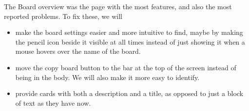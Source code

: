 \vspace{2mm}

The Board overview was the page with the most features, and also the most reported problems. To fix these, we will
\begin{itemize}
    \item make the board settings easier and more intuitive to find, maybe by making the pencil icon beside it visible at all times instead of just showing it when a mouse hovers over the name of the board.
    \item move the copy board button to the bar at the top of the screen instead of being in the body. We will also make it more easy to identify.
    \item provide cards with both a description and a title, as opposed to just a block of text as they have now.
\end{itemize}